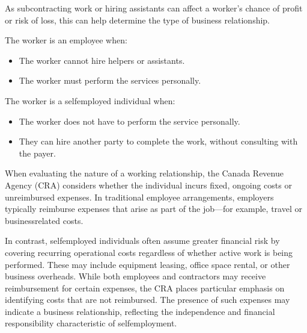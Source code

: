 \documentclass[letterpaper,10pt,english]{sphinxmanual}
\begin{document}
\sphinxAtStartPar
{}

\sphinxAtStartPar
As subcontracting work or hiring assistants can affect a worker’s chance of profit or risk of loss, this can help determine
the type of business relationship.

\sphinxAtStartPar
The worker is an employee when:
\begin{itemize}
\item {} 
\sphinxAtStartPar
The worker cannot hire helpers or assistants.

\item {} 
\sphinxAtStartPar
The worker must perform the services personally.

\end{itemize}

\sphinxAtStartPar
The worker is a self\sphinxhyphen{}employed individual when:
\begin{itemize}
\item {} 
\sphinxAtStartPar
The worker does not have to perform the service personally.

\item {} 
\sphinxAtStartPar
They can hire another party to complete the work, without consulting with the payer.

\end{itemize}

\sphinxAtStartPar
{}

\sphinxAtStartPar
When evaluating the nature of a working relationship, the Canada Revenue Agency (CRA) considers whether the individual
incurs fixed, ongoing costs or unreimbursed expenses. In traditional employee arrangements, employers typically reimburse
expenses that arise as part of the job—for example, travel or business\sphinxhyphen{}related costs.

\sphinxAtStartPar
In contrast, self\sphinxhyphen{}employed individuals often assume greater financial risk by covering recurring operational costs
regardless of whether active work is being performed. These may include equipment leasing, office space rental, or other
business overheads. While both employees and contractors may receive reimbursement for certain expenses, the CRA places
particular emphasis on identifying costs that are not reimbursed. The presence of such expenses may indicate a business
relationship, reflecting the independence and financial responsibility characteristic of self\sphinxhyphen{}employment.
\end{document}
